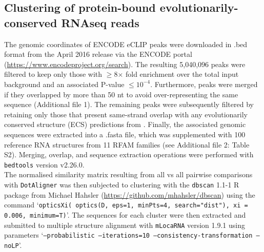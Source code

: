 \documentclass{bmcart}
\newcommand\dotaligner{\texttt{DotAligner}}
\begin{document}
\subsection*{Clustering of protein-bound evolutionarily-conserved RNAseq reads}

The genomic coordinates of ENCODE eCLIP peaks were downloaded in .bed format from the April 2016 release via the ENCODE portal (\url{https://www.encodeproject.org/search}). The resulting 5,040,096 peaks 
were filtered to keep only those with $\ge$8$\times$ fold enrichment over the total input background and an associated P-value  $\leq10^{-4}$. Furthermore, peaks were merged if they overlapped by more than 50 nt to avoid over-representing the same sequence (Additional file 1). The remaining peaks were subsequently filtered by 
retaining only those that present same-strand overlap with any evolutionarily conserved structure (ECS) predictions from \cite{smith2013widespread}. Finally, the associated genomic sequences were extracted into a .fasta file, which was supplemented with 100 reference RNA structures from 11 RFAM families (see Additional file 2: Table S2). 
Merging, overlap, and sequence extraction operations were performed with \texttt{bedtools} version v2.26.0. \\

The normalised similarity matrix resulting from all vs all pairwise comparisons with \dotaligner{} was then 
subjected to clustering with the \texttt{dbscan} 1.1-1 R package from Michael Hahsler (\url{https://github.com/mhahsler/dbscan}) using the command `\texttt{opticsXi( optics(D, eps=1, minPts=4, search="dist"), xi = 0.006, minimum=T)}'. The sequences for each cluster were then extracted and submitted to multiple structure alignment with \texttt{mLocaRNA} version 1.9.1 using parameters  `\texttt{--probabilistic --iterations=10  --consistency-transformation --noLP}'.\\
 

\end{document}
